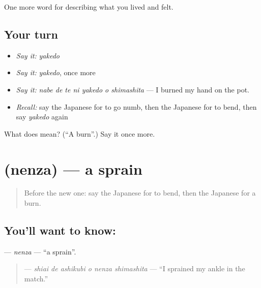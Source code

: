\begin{grammarlens}[title={What you've built}]
One more word for describing what you lived and felt.
\end{grammarlens}

\subsection*{Your turn}
\begin{itemize}
\raggedright
  \item \emph{Say it:} \emph{yakedo}
  \item \emph{Say it:} \emph{yakedo}, once more
  \item \emph{Say it:} \emph{nabe de te ni yakedo o shimashita} — I burned my hand on the pot.
  \item \emph{Recall:} say the Japanese for to go numb, then the Japanese for to bend, then say \emph{yakedo} again
\end{itemize}

\begin{tcolorbox}[breakable,colback=teal!4,colframe=teal!35!black,title={Before you move on}]
What does  mean? (\textquotedblleft{}A burn\textquotedblright{}.) Say it once more.
\end{tcolorbox}
\section[\texorpdfstring{\ja{ねんざ} (nenza)}{ねんざ (nenza)}]{ (nenza) — a sprain}

\label{lesson:JA-C449-nenza}



\begin{quote}
Before the new one: say the Japanese for to bend, then the Japanese for a burn.
\end{quote}

\subsection*{You'll want to know: }
\textbf{} — \emph{nenza} — \textquotedblleft{}a sprain\textquotedblright{}.

\begin{quote}
\textbf{  } — \emph{shiai de ashikubi o nenza shimashita} — \textquotedblleft{}I sprained my ankle in the match.\textquotedblright{}
\end{quote}

